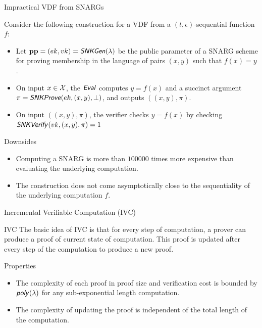 \documentclass[UTF8]{beamer}
\begin{document}
	\begin{frame}{Impractical VDF from SNARGs}
		\begin{block}{}
			Consider the following construction for a VDF from a $(t,\epsilon)$-sequential function $f$:
			\begin{itemize}
				\item Let $\mathbf{pp}=(ek,vk)=\textsf{\textit{SNKGen}}(\lambda)$ be the public parameter of a SNARG scheme for proving membership in the language of pairs $(x,y)$ such that $f(x)=y$.
				\item On input $x\in\mathcal{X}$, the $\textsf{\textit{Eval}}$ computes $y=f(x)$ and a succinct argument $\pi=\textsf{\textit{SNKProve}}(ek,(x,y),\bot)$, and outputs $((x,y),\pi)$.
				\item On input $((x,y),\pi)$, the verifier checks $y=f(x)$ by checking $\textsf{\textit{SNKVerify}}(vk,(x,y),\pi)=1$
			\end{itemize}
		\end{block}
		\begin{block}{Downsides}
			\begin{itemize}
				\item Computing a SNARG is more than $100000$ times more expensive than evaluating the underlying computation.
				\item The construction does not come asymptotically close to the sequentiality of the underlying computation $f$.
			\end{itemize}
		\end{block}
	\end{frame}

	\begin{frame}{Incremental Verifiable Computation (IVC)}
		\begin{block}{IVC}
			The basic idea of IVC is that for every step of computation, a prover can produce a proof of current state of computation. This proof is updated after every step of the computation to produce a new proof.
		\end{block}
		\begin{block}{Properties}
			\begin{itemize}
				\item The complexity of each proof in proof size and verification cost is bounded by $\textsf{\textit{poly}}(\lambda)$ for any sub-exponential length computation.
				\item The complexity of updating the proof is independent of the total length of the computation.
			\end{itemize}
		\end{block}
	\end{frame}
\end{document}
